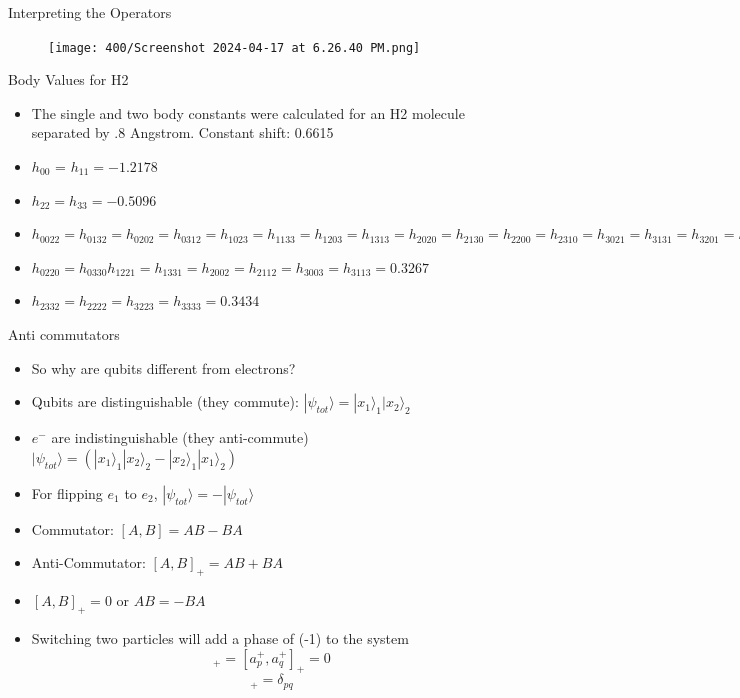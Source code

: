 \begin{frame}{Interpreting the Operators}
\begin{figure}
    \centering
    \texttt{[image: 400/Screenshot 2024-04-17 at 6.26.40 PM.png]}
\end{figure}
    
\end{frame}

\begin{frame}{Body Values for H2}
    \begin{itemize}
        \item The single and two body constants were calculated for an H2 molecule separated by .8 Angstrom. Constant shift: 0.6615
        \item $h_{00}$ = $h_{11}= -1.2178$
        \item $h_{22} = h_{33} = -0.5096$
        \item $h_{0022} = h_{0132} = h_{0202} = h_{0312} = h_{1023} = h_{1133} = h_{1203} = h_{1313} = h_{2020} = h_{2130} = h_{2200} = h_{2310} = h_{3021} = h_{3131} = h_{3201} = h_{3113} = 0.0923$
        \item $h_{0220} = h_{0330} h_{1221} = h_{1331} = h_{2002} = h_{2112} = h_{3003} = h_{3113} = 0.3267$
        \item $h_{2332} = h_{2222} = h_{3223} = h_{3333} = 0.3434$
    \end{itemize}
\end{frame}



\begin{frame}{Anti commutators}
    \begin{itemize}
        \item So why are qubits different from electrons?
        \item Qubits are distinguishable (they commute): $|\psi_{tot}\rangle = |x_1\rangle_1 |x_2\rangle_2$
        \item $e^-$ are indistinguishable (they anti-commute) $|\psi_{tot}\rangle = (|x_1\rangle_1 |x_2\rangle_2-|x_2\rangle_1|x_1\rangle_2)$
        \item For flipping $e_1$ to $e_2$, $|\psi_{tot}\rangle=-|\psi_{tot}\rangle$
        \item Commutator: $[A,B]=AB-BA$
        \item Anti-Commutator: $[A,B]_{+} = AB+BA$
        \item $[A,B]_{+}=0$ or $AB=-BA$
        \item Switching two particles will add a phase of (-1) to the system
        \begin{equation}
            [a_p^-,a_q^-]_+=[a_p^+,a_q^+]_+ = 0
        \end{equation}
        \begin{equation}
            [a_p^-,a_q^+]_+ = \delta_{pq}
        \end{equation}
    \end{itemize}
\end{frame}





